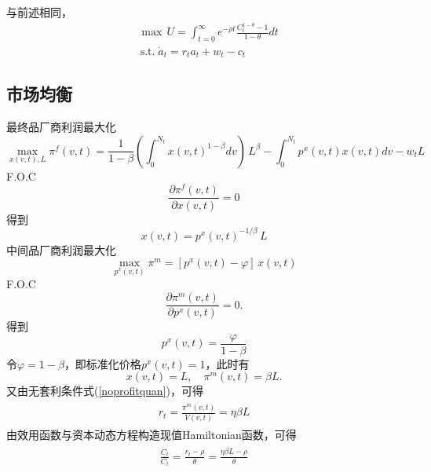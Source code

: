 \documentclass[cn,normal,11pt,black]{elegantnote}
\begin{document}
\begin{definition}[个人效用函数]
    与前述相同，
    \begin{align}
        & \max \, U  = \int_{t=0}^{\infty} e^{-\rho t} \frac{C_t^{1-\theta} -1}{1-\theta} dt \\
        & \, \mathrm{s.t.} \; \dot{a}_t =  r_t a_t + w_t - c_t
    \end{align}
\end{definition}

\subsection{市场均衡}


    最终品厂商利润最大化
    \begin{equation}
        \max_{x(v,t), L} \pi^{f}(v,t) = 
            \frac{1}{1-\beta} \left( \int_0^{N_t} x(v,t)^{1-\beta} dv \right) \, L^\beta 
            - \int_0^{N_t} p^x(v,t)x(v,t)dv - w_t L
    \end{equation}
    F.O.C
    \begin{equation}
        \frac{\partial \pi^f(v,t)}{\partial x(v,t)} = 0
    \end{equation}
    得到
    \begin{equation} \label{quanmx}
        x(v,t) = {p^x(v,t)}^{-1/\beta} \, L
    \end{equation}
    中间品厂商利润最大化
    \begin{equation}
        \max_{p^x(v,t)} \pi^m = \left[p^x(v,t) - \varphi\right] \, x(v,t)
    \end{equation}
    F.O.C
    \begin{equation}
        \frac{\partial \pi^m(v,t)}{\partial p^x(v,t)} = 0.
    \end{equation}
    得到
    \begin{equation} \label{quanmxp}
        p^x(v,t) = \frac{\varphi}{1-\beta} 
    \end{equation}
    令$\varphi = 1-\beta$，即标准化价格$p^x(v,t)=1$，此时有
    \begin{equation}
        x(v,t) = L, \quad \pi^m(v,t) = \beta L.
    \end{equation}
    又由无套利条件式(\ref{noprofitquan})，可得
    \begin{align}
    \begin{aligned}
        r_t = \frac{\pi^m(v,t)}{V(v,t)}  = \eta \beta L
    \end{aligned}
    \end{align}
    由效用函数与资本动态方程构造现值Hamiltonian函数，可得
    \begin{align}
    \begin{aligned}
        \frac{\dot{C}_t}{C_t} = \frac{r_t -  \rho}{\theta}  = \frac{\eta \beta L -  \rho}{\theta}
    \end{aligned}
    \end{align}
\end{document}
